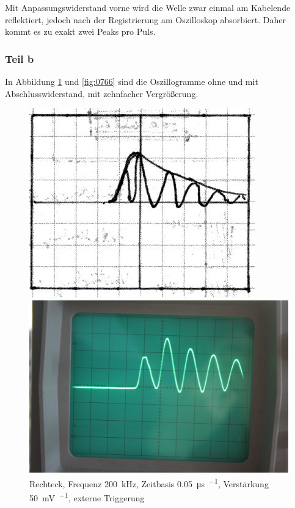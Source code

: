 Mit Anpassungswiderstand vorne wird die Welle zwar einmal am Kabelende
reflektiert, jedoch nach der Registrierung am Oszilloskop absorbiert. Daher
kommt es zu exakt zwei Peaks pro Puls.

\FloatBarrier
\subsubsection{Teil b}

In Abbildung \ref{fig:0764} und \ref{fig:0766} sind die Oszillogramme ohne und
mit Abschlusswiderstand, mit zehnfacher Vergrößerung.

\begin{figure}[htbp]
	\centering
	\begin{minipage}{.45\linewidth}
	\includegraphics[width=\linewidth]{Skizzen/IMG_0764-1500.jpg}
	\end{minipage}
	\hfill
	\begin{minipage}{.45\linewidth}
	\includegraphics[width=\linewidth]{Fotos/IMG_0764-1500.jpg}
	\end{minipage}
	\caption{%
		Rechteck, Frequenz \SI{200}{\kilo\hertz},
		Zeitbasis \SI{.05}{\micro\second\per\division},
		Verstärkung \SI{50}{\milli\volt\per\division},
		externe Triggerung
	}
	\label{fig:0764}
\end{figure}

